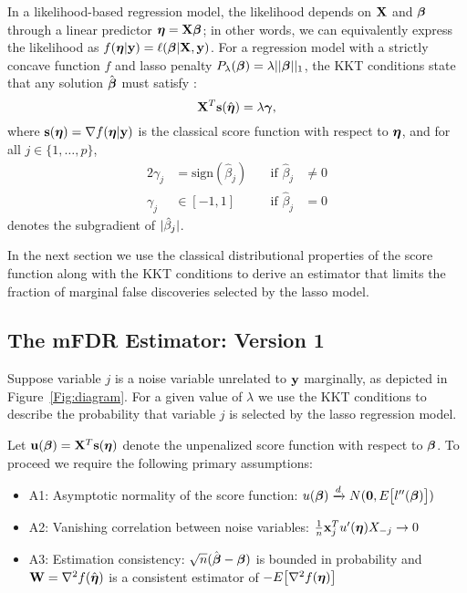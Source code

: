 In a likelihood-based regression model, the likelihood depends on $\mathbf{X}$ and $\boldsymbol{\beta}$ through a linear predictor $\boldsymbol{\eta} = \mathbf{X}\boldsymbol{\beta}$; in other words, we can equivalently express the likelihood as $f(\boldsymbol{\eta}|\mathbf{y})=\ell(\boldsymbol{\beta}|\mathbf{X},\mathbf{y})$.  For a regression model with a strictly concave function $f$ and lasso penalty $P_{\lambda} (\boldsymbol{\beta}) = \lambda||\boldsymbol{\beta}||_1$, the KKT conditions state that any solution $\hat{\boldsymbol{\beta}}$ must satisfy \citep{lasso_kkt}:
\begin{equation*}
\mathbf{X}^T\mathbf{s}(\hat{\boldsymbol{\eta}}) = \lambda\boldsymbol{\gamma},
\end{equation*}
where $\mathbf{s}(\boldsymbol{\eta}) = \nabla f(\boldsymbol{\eta}|\mathbf{y})$ is the classical score function with respect to $\boldsymbol{\eta}$, and for all $j \in \{1, \ldots, p\}$,
\begin{alignat*}{2}
\gamma_j & = \textrm{sign}(\hat{\beta}_j) &\quad \text{if } \hat{\beta}_j &\neq 0 \\
\gamma_j & \in [-1,1]  &\quad \text{if }  \hat{\beta}_j &= 0
\end{alignat*}
denotes the subgradient of $|\hat{\beta}_j|$.


In the next section we use the classical distributional properties of the score function along with the KKT conditions to derive an estimator that limits the fraction of marginal false discoveries selected by the lasso model.

\subsection{The mFDR Estimator: Version 1}

Suppose variable $j$ is a noise variable unrelated to $\mathbf{y}$ marginally, as depicted in Figure~\ref{Fig:diagram}. For a given value of $\lambda$ we use the KKT conditions to describe the probability that variable $j$ is selected by the lasso regression model.

Let $\mathbf{u}(\boldsymbol{\beta}) = \mathbf{X}^T \mathbf{s}(\boldsymbol{\eta})$ denote the unpenalized score function with respect to $\boldsymbol{\beta}$.  To proceed we require the following primary assumptions: 

\begin{itemize}
\item A1: Asymptotic normality of the score function: $u(\boldsymbol{\beta}) \xrightarrow{d} N(\mathbf{0},  E\big[l''(\boldsymbol{\beta})\big])$
\item A2: Vanishing correlation between noise variables: $\frac{1}{n}\mathbf{x}_j^T u'(\boldsymbol{\eta})X_{-j} \rightarrow 0$
\item A3: Estimation consistency: $\sqrt{n}(\hat{\boldsymbol{\beta}}-  \boldsymbol{\beta})$ is bounded in probability and $\mathbf{W} = \nabla^2 f(\hat{\boldsymbol{\eta}})$ is a consistent estimator of $-E\big[\nabla^2 f(\boldsymbol{\eta})\big]$
\end{itemize}

